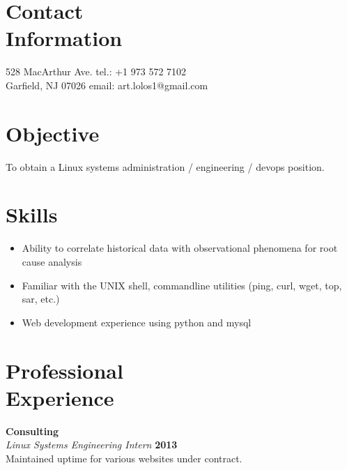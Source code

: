 \documentclass[margin,line]{resume}
\begin{document}
\begin{resume}

    \section{\mysidestyle Contact\\Information}

    528 MacArthur Ave.                             \hfill tel.: +1 973 572 7102              \vspace{0mm}\\\vspace{0mm}%
    Garfield, NJ 07026                       \hfill email: art.lolos1@gmail.com              \vspace{0mm}\\\vspace{0mm}%

    \section{\mysidestyle Objective}
    To obtain a Linux systems administration / engineering / devops position.


    \section{\mysidestyle Skills}

    \begin{itemize}
    \item Ability to correlate historical data with observational phenomena for root cause analysis
    \item Familiar with the UNIX shell, commandline utilities (ping, curl, wget, top, sar, etc.)
    \item Web development experience using python and mysql
    \end{itemize}
    

    \section{\mysidestyle Professional\\Experience}
    \textbf{Consulting} \vspace{2mm}\\\vspace{1mm}%
    \textsl{Linux Systems Engineering Intern} \hfill \textbf{2013}\\
    Maintained uptime for various websites under contract.


\end{resume}
\end{document}
